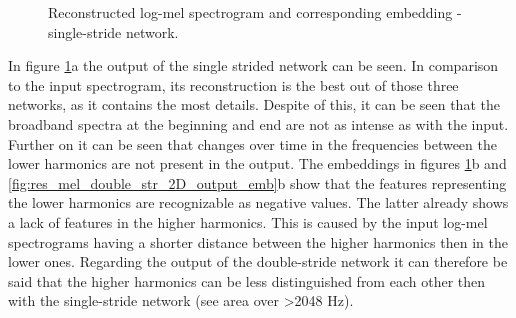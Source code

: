 \begin{figure}[htb!]
    \centering
    \captionsetup{justification=centering}
    \caption{Reconstructed log-mel spectrogram and corresponding embedding - single-stride network.}
    \label{fig:res_mel_single_str_2D_output_emb}
\end{figure}

In figure \ref{fig:res_mel_single_str_2D_output_emb}a the output of the single strided network can be seen. In comparison to the input spectrogram, its reconstruction is the best out of those three networks, as it contains the most details. Despite of this, it can be seen that the broadband spectra at the beginning and end are not as intense as with the input. Further on it can be seen that changes over time in the frequencies between the lower harmonics are not present in the output. The embeddings in figures \ref{fig:res_mel_single_str_2D_output_emb}b and \ref{fig:res_mel_double_str_2D_output_emb}b show that the features representing the lower harmonics are recognizable as negative values. The latter already shows a lack of features in the higher harmonics. This is caused by the input log-mel spectrograms having a shorter distance between the higher harmonics then in the lower ones. Regarding the output of the double-stride network it can therefore be said that the higher harmonics can be less distinguished from each other then with the single-stride network (see area over >2048 Hz).


